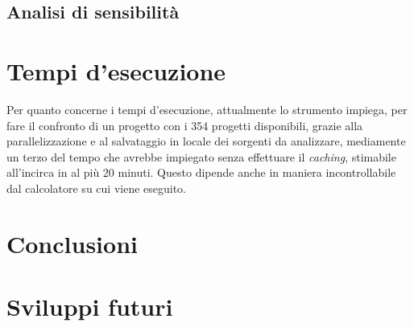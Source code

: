 \subsection{Analisi di sensibilità}

\section{Tempi d'esecuzione}
Per quanto concerne i tempi d'esecuzione, attualmente lo strumento impiega, per fare il confronto di un progetto con i 354 progetti disponibili, grazie alla parallelizzazione e al salvataggio in locale dei sorgenti da analizzare, mediamente un terzo del tempo che avrebbe impiegato senza effettuare il \textit{caching}, stimabile all'incirca in al più 20 minuti.
%
Questo dipende anche in maniera incontrollabile dal calcolatore su cui viene eseguito.

\section{Conclusioni}

\section{Sviluppi futuri}
